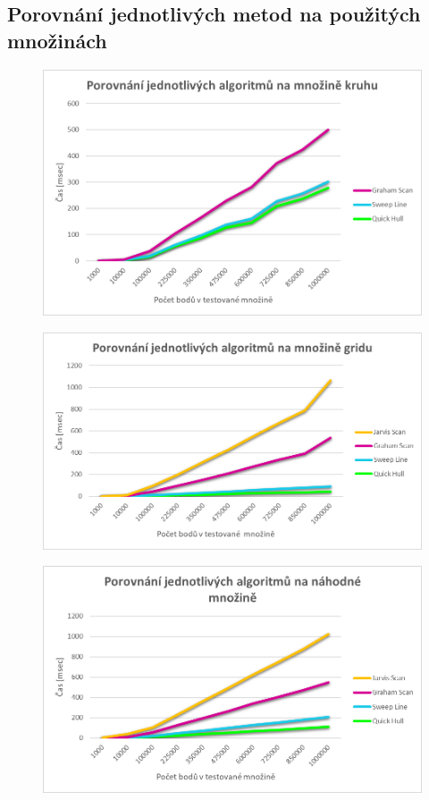 \documentclass[a4paper, 12pt]{article}
\begin{document}
\clearpage
\subsection{Porovnání jednotlivých metod na použitých množinách}
\begin{figure}[h!]
	\centering
	\includegraphics[width=15cm]{grafy/kruh.png}
\end{figure}

\begin{figure}[h!]
	\centering
	\includegraphics[width=15cm]{grafy/grid.png}
\end{figure}

\clearpage
\begin{figure}[h!]
	\centering
	\includegraphics[width=15cm]{grafy/random.png}
\end{figure}
\end{document}
